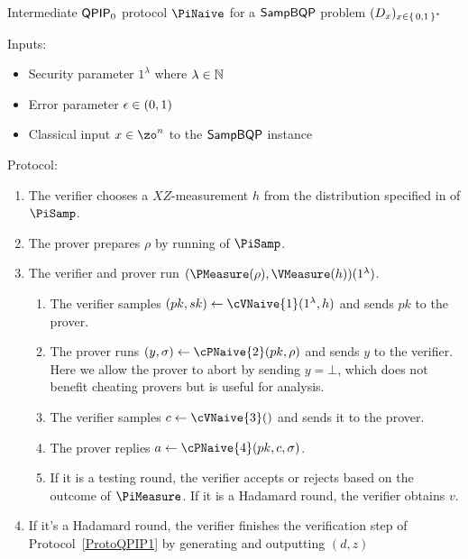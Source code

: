 \begin{protocol}{Intermediate $\operatorname{\mathsf{QPIP}}_0$ protocol $\PiNaive$ for a $\operatorname{\mathsf{SampBQP}}$ problem $(D_x)_{x\in\set{0, 1}^*}$}
    \label{proto:qpip0_naive}

    Inputs:
    \begin{itemize}
        \item Security parameter $1^\lambda$ where $\lambda\in\mathbb{N}$
        \item Error parameter $\epsilon\in(0, 1)$
        \item Classical input $x\in\zo^n$ to the $\operatorname{\mathsf{SampBQP}}$ instance
    \end{itemize}

    Protocol:
    \begin{enumerate}
        \item \label{step:naive1} The verifier chooses a $XZ$-measurement $h$ from the distribution specified in  of $\PiSamp$.
        \item \label{step:naive2} The prover prepares $\rho$ by running  of $\PiSamp$.
        \item \label{step:urmila-in-naive}
            The verifier and prover run $(\PMeasure(\rho), \VMeasure(h))(1^\lambda)$.
            \begin{enumerate}
                \item The verifier samples $(pk, sk)\leftarrow\cVNaive{1}(1^\lambda, h)$ and sends $pk$ to the prover.
                \item The prover runs $(y, \sigma)\leftarrow\cPNaive{2}(pk, \rho)$ and sends $y$ to the verifier.
                    Here we allow the prover to abort by sending $y=\bot$, which does not benefit cheating provers but is useful for analysis.
                \item\label{step:c-urmila-in-naive} The verifier samples $c\leftarrow\cVNaive{3}()$  and sends it to the prover.
                \item The prover replies $a\leftarrow\cPNaive{4}(pk, c, \sigma)$.
                \item
                    If it is a testing round, the verifier accepts or rejects based on the outcome of $\PiMeasure$.
                    If it is a Hadamard round, the verifier obtains $v$.
            \end{enumerate}
        \item \label{step:naive-output} If it's a Hadamard round, the verifier finishes the verification step of Protocol~\ref{ProtoQPIP1} by generating and outputting $(d, z)$
    \end{enumerate}
\end{protocol}

